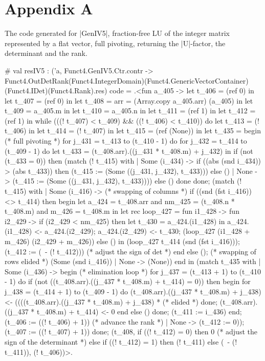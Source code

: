 \documentclass[draft]{elsart}
\begin{document}
\section{Appendix A}
The code generated for |GenIV5|, fraction-free LU of the integer matrix
represented by a flat vector, full pivoting, returning the |U|-factor,
the determinant and the rank.
\begin{code2}
# val resIV5 : ('a,
   Funct4.GenIV5.Ctr.contr ->
   Funct4.OutDetRank(Funct4.IntegerDomain)(Funct4.GenericVectorContainer)
                    (Funct4.IDet)(Funct4.Rank).res) code =
  .<fun a_405 ->
   let t_406 = (ref 0) in let t_407 = (ref 0) in
   let t_408 = {arr = (Array.copy a_405.arr)} (a_405) in
   let t_409 = a_405.m in let t_410 = a_405.n in
   let t_411 = (ref 1) in let t_412 = (ref 1) in
   while (((! t_407) < t_409) && ((! t_406) < t_410)) do
    let t_413 = (! t_406) in let t_414 = (! t_407) in
    let t_415 = (ref (None)) in
    let t_435 =
     begin  (* full pivoting *)
      for j_431 = t_413 to (t_410 - 1) do
       for j_432 = t_414 to (t_409 - 1) do
        let t_433 = (t_408.arr).((j_431 * t_408.m) + j_432) in
        if (not (t_433 = 0)) then
         (match (! t_415) with
          | Some (i_434) ->
             if ((abs (snd i_434)) > (abs t_433)) then
              (t_415 := (Some ((j_431, j_432), t_433))) else ()
          | None -> (t_415 := (Some ((j_431, j_432), t_433))))
        else ()
       done
      done;
      (match (! t_415) with
       | Some (i_416) ->  (* swapping of columns *)
          if ((snd (fst i_416)) <> t_414) then begin
           let a_424 = t_408.arr and nm_425 = (t_408.n * t_408.m)
           and m_426 = t_408.m in
           let rec loop_427 =
            fun i1_428 -> fun i2_429 ->
              if (i2_429 < nm_425) then
               let t_430 = a_424.(i1_428) in
               a_424.(i1_428) <- a_424.(i2_429);
               a_424.(i2_429) <- t_430;
               (loop_427 (i1_428 + m_426) (i2_429 + m_426))
              else () in
           (loop_427 t_414 (snd (fst i_416)));
           (t_412 := (~- (! t_412))) (* adjust the sign of det *)
          end else (); (* swapping of rows elided *)
          (Some (snd i_416))
       | None -> (None))
     end in
    (match t_435 with
     | Some (i_436) ->
        begin (* elimination loop *)
         for j_437 = (t_413 + 1) to (t_410 - 1) do
          if (not ((t_408.arr).((j_437 * t_408.m) + t_414) = 0)) then begin
           for j_438 = (t_414 + 1) to (t_409 - 1) do
            (t_408.arr).((j_437 * t_408.m) + j_438) <-
             ((((t_408.arr).((j_437 * t_408.m) + j_438) * (* elided *)
           done;
           (t_408.arr).((j_437 * t_408.m) + t_414) <- 0
          end else ()
         done; (t_411 := i_436)
        end;
        (t_406 := ((! t_406) + 1)) (* advance the rank *)
     | None -> (t_412 := 0));
    (t_407 := ((! t_407) + 1))
   done;
   (t_408, 
    if ((! t_412) = 0) then 0 (* adjust the sign of the determinant *)
    else if ((! t_412) = 1) then (! t_411)
    else (~- (! t_411)), (! t_406))>.
\end{code2}
\end{document}
